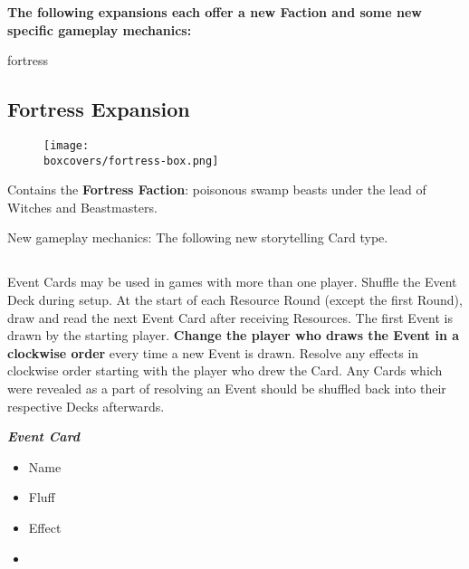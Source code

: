 \textbf{The following expansions each offer a new Faction and some new specific gameplay mechanics:}
\begin{multicols}{2}
\begin{expansion}[title=]{fortress}
  \subsection*{\color{fortress}Fortress Expansion}
  \setlength\intextsep{0pt}
  \setlength\columnsep{0.8em}
  \begin{wrapfigure}{l}{0.35\textwidth}
      \texttt{[image: \\boxcovers/fortress-box.png]}
  \end{wrapfigure}
  Contains the \textbf{Fortress Faction}: poisonous swamp beasts under the lead of Witches and Beastmasters.\par
  \medskip
  New gameplay mechanics: The following new storytelling Card type.
  \medskip
  \subsection*{}
  Event Cards may be used in games with more than one player.
  Shuffle the Event Deck during setup.
  At the start of each Resource Round (except the first Round), draw and read the next Event Card after receiving Resources.
  The first Event is drawn by the starting player.
  \textbf{Change the player who draws the Event in a clockwise order} every time a new Event is drawn.
  Resolve any effects in clockwise order starting with the player who drew the Card.
  Any Cards which were revealed as a part of resolving an Event should be shuffled back into their respective Decks afterwards.

  \medskip

  \begin{minipage}[h]{\linewidth}
    \vspace{0.1pt}
    \centering
    \begin{scriptsize}
    \end{scriptsize}
    \footnotesize
    \textbf{\textit{\textcolor{darkcandyapplered}{Event Card}}}
    \begin{multicols}{2}
      \begin{itemize}
        \item[\textbf{1.}] Name
        \item[\textbf{2.}] Fluff
        \item[\textbf{3.}] Effect
        \item[\textbf{\phantom{.}}] \phantom{.}
      \end{itemize}
    \end{multicols}
  \end{minipage}
\end{expansion}


\end{multicols}
